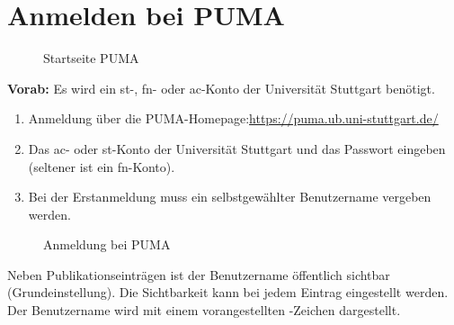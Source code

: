 \section{Anmelden bei PUMA} 
\label{sec:anmeldenBeiPuma}
\begin{figure}[h!]
 \centering
 \caption{Startseite PUMA}
 \label{fig:startseitePuma}
\end{figure}
\textbf{Vorab:} Es wird ein st-, fn- oder ac-Konto der Universität Stuttgart benötigt.
\begin{enumerate}
    \item Anmeldung über die PUMA-Homepage:\newline \url{https://puma.ub.uni-stuttgart.de/}
    \item Das ac- oder st-Konto der Universität Stuttgart und das Passwort eingeben (seltener ist ein fn-Konto).  
    \item Bei der Erstanmeldung muss ein selbstgewählter Benutzername vergeben werden.
\end{enumerate}
 \begin{figure}[h!]
 \centering
 \caption{Anmeldung bei PUMA}
 \label{fig:anmeldungPuma}
\end{figure} 
Neben Publikationseinträgen ist der Benutzername öffentlich sichtbar (Grundeinstellung). Die Sichtbarkeit kann bei jedem Eintrag eingestellt werden. Der Benutzername wird mit einem vorangestellten \@-Zeichen dargestellt.
